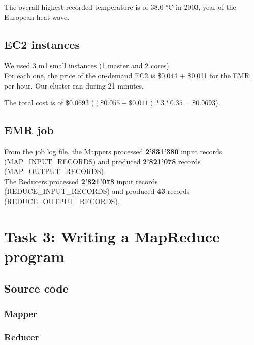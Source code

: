 \documentclass[a4paper]{article}
\begin{document}
	The overall highest recorded temperature is of 38.0 °C in 2003, year of the European heat wave.

	\subsection{EC2 instances}
	We used 3 m1.small instances (1 master and 2 cores). \\
	For each one, the price of the on-demand EC2 is \$0.044 + \$0.011 for the EMR per hour.
	Our cluster ran during 21 minutes.
	
	The total cost is of \$0.0693 ($(\$0.055+\$0.011)*3*0.35 = \$0.0693$).
	
	\subsection{EMR job}
	From the job log file, the Mappers processed \textbf{2'831'380} input records (MAP\_INPUT\_RECORDS) and produced \textbf{2'821'078} records (MAP\_OUTPUT\_RECORDS). \\
	The Reducers processed \textbf{2'821'078} input records (REDUCE\_INPUT\_RECORDS) and produced \textbf{43} records (REDUCE\_OUTPUT\_RECORDS).

	\pagebreak

	\section{Task 3: Writing a MapReduce program}

	\subsection{Source code}

	\subsubsection{Mapper}
	

	\subsubsection{Reducer}
	
\end{document}
